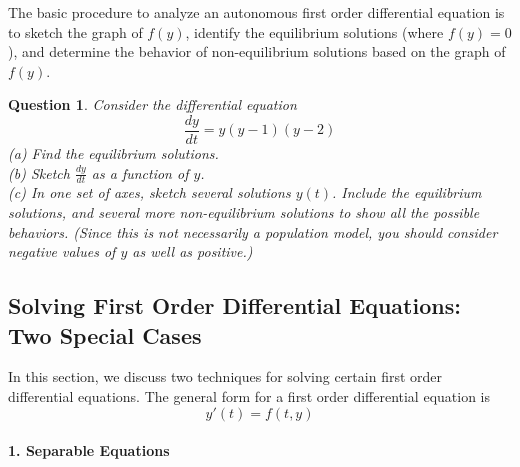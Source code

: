 \documentclass{book}
\newtheorem{question}{Question}
\begin{document}
The basic procedure to analyze an autonomous
first order differential equation is to sketch the graph of $f(y)$, identify
the equilibrium solutions (where $f(y)=0$), and determine the
behavior of non-equilibrium solutions based on the graph
of $f(y)$.

\begin{question}
Consider the differential equation
\[
   \frac{dy}{dt} = y(y-1)(y-2)
\]
(a) Find the equilibrium solutions.\\
(b) Sketch $\frac{dy}{dt}$ as a function of $y$.\\
(c) In one set of axes, sketch several solutions $y(t)$. Include the equilibrium solutions,
and several more non-equilibrium solutions to show all the possible behaviors.
(Since this is not necessarily a population model, you should consider negative values
of $y$ as well as positive.)
\end{question}



\subsection{Solving First Order Differential Equations: Two Special Cases}

In this section, we discuss
two techniques for solving certain first order
differential equations.
The general form for a first order differential equation is
\begin{equation}
   y'(t) = f(t,y)
\end{equation}
\paragraph{1. Separable Equations} ~
\end{document}
